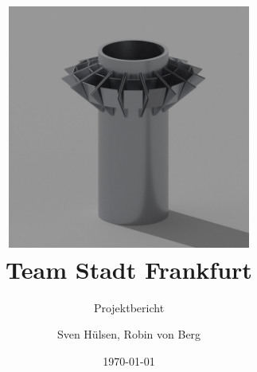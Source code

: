 \documentclass[11pt,oneside,headsepline,a4paper,ngerman]{scrreprt}
\newcommand{\vcontext}{Softwareprojekt}
\newcommand{\vprof}{Prof. Hoffmann}
\newcommand{\vsubject}{Cross Innovation Class 2022}
\newcommand{\vtitle}{Team Stadt Frankfurt}
\newcommand{\vsubtitle}{Projektbericht}
\newcommand{\vauthor}{Sven Hülsen, Robin von Berg}
\begin{document}
\titlehead{\vcontext{}\\\vprof{}}
\subject{\vsubject{}}
\title{\includegraphics[width=8cm]{media/01_project/render_bin.jpg}\\\vtitle{}}
\subtitle{\vsubtitle{}}
\author{\vauthor{}}
\date{\today}

\maketitle


\tableofcontents









\setcounter{biburlnumpenalty}{8000}

\printbibliography{}

\listoffigures{}
\end{document}

